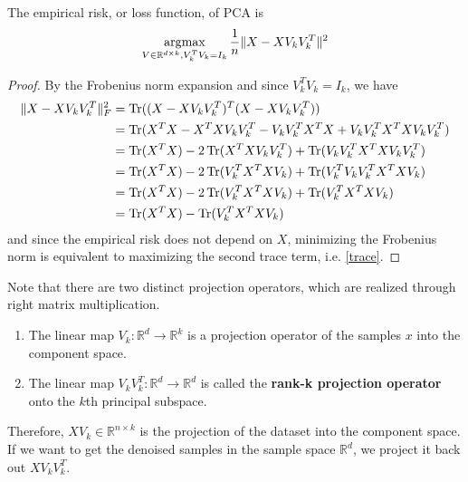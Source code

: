   \begin{theorem}
    The empirical risk, or loss function, of PCA is
    \begin{equation}
      \operatorname*{\arg\!\max}_{V \in \mathbb{R}^{d \times k}, V_k^T V_k = I_k} 
      \frac{1}{n} \| X - X V_k V_k^T\|^2
    \end{equation}
  \end{theorem} 
  \begin{proof}
    By the Frobenius norm expansion and since $V_k^T V_k = I_k$, we have 
    \begin{align}
      \|X - X V_k V_k^T\|_F^2 
      & = \operatorname{Tr}((X - X V_k V_k^T)^T(X - X V_k V_k^T)) \\
      & = \operatorname{Tr}(X^T X - X^T X V_k V_k^T - V_k V_k^T X^T X + V_k V_k^T X^T X V_k V_k^T) \\
      & = \operatorname{Tr}(X^T X) - 2\operatorname{Tr}(X^T X V_k V_k^T) + \operatorname{Tr}(V_k V_k^T X^T X V_k V_k^T) \\ 
      & = \operatorname{Tr}(X^T X) - 2\operatorname{Tr}(V_k^T X^T X V_k) + \operatorname{Tr}(V_k^T V_k V_k^T X^T X V_k) \\
      & = \operatorname{Tr}(X^T X) - 2\operatorname{Tr}(V_k^T X^T X V_k) + \operatorname{Tr}(V_k^T X^T X V_k) \\ 
      & = \operatorname{Tr}(X^T X) - \operatorname{Tr}(V_k^T X^T X V_k) 
    \end{align}
    and since the empirical risk does not depend on $X$, minimizing the Frobenius norm is equivalent to maximizing the second trace term, i.e. \ref{trace}. 
  \end{proof}

  \begin{definition}
    Note that there are two distinct projection operators, which are realized through right matrix multiplication. 
    \begin{enumerate}
      \item The linear map $V_k : \mathbb{R}^d \to \mathbb{R}^k$ is a projection operator of the samples $x$ into the component space. 
      \item The linear map $V_k V_k^T : \mathbb{R}^d \to \mathbb{R}^d$ is called the \textbf{rank-k projection operator} onto the $k$th principal subspace. 
    \end{enumerate}
  \end{definition}

Therefore, $X V_k \in \mathbb{R}^{n \times k}$ is the projection of the dataset into the component space. If we want to get the denoised samples in the sample space $\mathbb{R}^d$, we project it back out $X V_k V_k^T$. 

